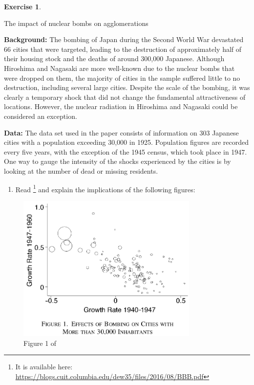 \documentclass[
  12pt,
  oneside]{book}
\providecommand{\tightlist}{%
  \setlength{\itemsep}{0pt}\setlength{\parskip}{0pt}}
\theoremstyle{definition}
\theoremstyle{definition}
\theoremstyle{definition}
\newtheorem{exercise}{Exercise}[chapter]
\theoremstyle{definition}
\theoremstyle{remark}
\begin{document}
\begin{exercise}
\protect\hypertarget{exr:bombs}{}\label{exr:bombs}

The impact of nuclear bombs on agglomerations

\textbf{Background:} The bombing of Japan during the Second World War devastated 66 cities that were targeted, leading to the destruction of approximately half of their housing stock and the deaths of around 300,000 Japanese. Although Hiroshima and Nagasaki are more well-known due to the nuclear bombs that were dropped on them, the majority of cities in the sample suffered little to no destruction, including several large cities. Despite the scale of the bombing, it was clearly a temporary shock that did not change the fundamental attractiveness of locations. However, the nuclear radiation in Hiroshima and Nagasaki could be considered an exception.

\textbf{Data:} The data set used in the paper consists of information on 303 Japanese cities with a population exceeding 30,000 in 1925. Population figures are recorded every five years, with the exception of the 1945 census, which took place in 1947. One way to gauge the intensity of the shocks experienced by the cities is by looking at the number of dead or missing residents.

\begin{enumerate}
\def\labelenumi{\alph{enumi})}
\tightlist
\item
  Read \citet{Davis2002Bones}\footnote{It is available here: \url{https://blogs.cuit.columbia.edu/dew35/files/2016/08/BBB.pdf}} and explain the implications of the following figures:
\end{enumerate}

\begin{figure}
\centering
\includegraphics[width=0.8\textwidth,height=\textheight]{fig/fig1weinstein.png}
\caption{\label{fig:fig1weinstein} Figure 1 of \citet{Davis2002Bones}}
\end{figure}


\end{exercise}
\end{document}
